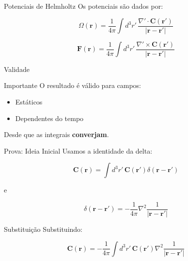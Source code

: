 \documentclass[aspectratio=169]{beamer}
\begin{document}
\begin{frame}{Potenciais de Helmholtz}
Os potenciais são dados por:

\begin{equation}
\Omega(\mathbf{r}) =
\frac{1}{4\pi} \int d^3 r' \,
\frac{\nabla' \cdot \mathbf{C}(\mathbf{r}')}{|\mathbf{r} - \mathbf{r}'|}
\end{equation}

\begin{equation}
\mathbf{F}(\mathbf{r}) =
\frac{1}{4\pi} \int d^3 r' \,
\frac{\nabla' \times \mathbf{C}(\mathbf{r}')}{|\mathbf{r} - \mathbf{r}'|}
\end{equation}
\end{frame}

\begin{frame}{Validade}
\begin{block}{Importante}
O resultado é válido para campos:

\begin{itemize}
\item Estáticos
\item Dependentes do tempo
\end{itemize}
\end{block}

Desde que as integrais \textbf{converjam}.
\end{frame}

\begin{frame}{Prova: Ideia Inicial}
Usamos a identidade da delta:

\begin{equation}
\mathbf{C}(\mathbf{r}) =
\int d^3 r' \, \mathbf{C}(\mathbf{r}') \delta(\mathbf{r}-\mathbf{r}')
\end{equation}

e

\begin{equation}
\delta(\mathbf{r}-\mathbf{r}') =
-\frac{1}{4\pi} \nabla^2 \frac{1}{|\mathbf{r}-\mathbf{r}'|}
\end{equation}
\end{frame}

\begin{frame}{Substituição}
Substituindo:

\begin{equation}
\mathbf{C}(\mathbf{r}) =
-\frac{1}{4\pi} \int d^3 r' \,
\mathbf{C}(\mathbf{r}') \nabla^2 \frac{1}{|\mathbf{r}-\mathbf{r}'|}
\end{equation}
\end{frame}
\end{document}
